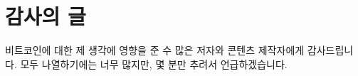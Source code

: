 \chapter*{감사의 글}

비트코인에 대한 제 생각에 영향을 준 수 많은 저자와 콘텐츠 제작자에게 감사드립니다.
모두 나열하기에는 너무 많지만, 몇 분만 추려서 언급하겠습니다.


\begin{itemize}
	\begin{comment}
		\item Thanks to Arjun Balaji for the tweet which motivated me to write this.
		\item Thanks to Marty Bent for providing endless food for thought and entertainment. If you are not subscribed to Marty’s Bent and Tales From The Crypt, you are missing out. Cheers Matt and Marty for guiding us through the rabbit hole.
		\item Thanks to Michael Goldstein and Pierre Rochard for curating and providing the greatest Bitcoin literature via the Nakamoto Institute. And thank you for creating the Noded Podcast which influenced my philosophical views on Bitcoin substantially.
		\item Thanks to Saifedean Ammous for his convictions, savage tweets, and writing The Bitcoin Standard
		\item Thanks to Francis Pouliot for sharing his excitement about finding out about the timechain.
		\item Thanks to Andreas M. Antonopoulos for all the educational material he has put out over the years.
		\item Thanks to Peter McCormack for his honest tweets and the What Bitcoin Did podcast, which keeps providing great insights from many areas of the space.
		\item Thanks to Jannik, Brandon, Matt, Camilo, Daniel, Michael, and Raphael for providing feedback to early drafts of some lessons. Special thanks to Jannik who proofread multiple drafts multiple times.
		\item Thanks to Dhruv Bansal and Matt Odell for taking the time to discuss some of these ideas with me.
		\item Thanks to Guy Swann for producing an audio version of 21lessons.com.
		\item Thanks to Friar Hass for his spiritual support and guidance, and for taking the time to write a foreword for this book.

\end{comment}
\end{itemize}
